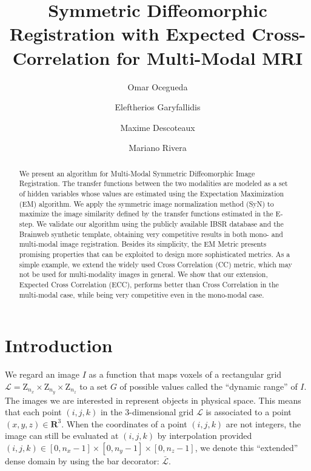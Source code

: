 \documentclass[11pt]{article}
\title{\textbf{Symmetric Diffeomorphic Registration with Expected Cross-Correlation for Multi-Modal MRI}}
\date{}
\author[a,*]{Omar Ocegueda}
\author[b]{Eleftherios Garyfallidis}
\author[b]{Maxime Descoteaux}
\author[a]{Mariano Rivera}
\affil[a]{Centro de Investigacion en Matematicas, Guanajuato, Gto, Mexico}
\affil[b]{University of Sherbrooke, Quebec, Canada}
\begin{document}
\maketitle
\begin{abstract}
    We present an algorithm for Multi-Modal Symmetric Diffeomorphic Image Registration. The transfer functions between the two modalities are modeled as a set of
    hidden variables whose values are estimated using the Expectation Maximization (EM) algorithm. We apply the symmetric image normalization method (SyN) to
    maximize the image similarity defined by the transfer functions estimated in the E-step. We validate our algorithm using the publicly available IBSR database
    and the Brainweb synthetic template, obtaining very competitive results in both mono- and multi-modal image registration. Besides its simplicity, the EM
    Metric presents promising properties that can be exploited to design more sophisticated metrics. As a simple example, we extend the widely used Cross
    Correlation (CC) metric, which may not be used for multi-modality images in general. We show that our extension, Expected Cross Correlation (ECC),
    performs better than Cross Correlation in the multi-modal case, while being very competitive even in the mono-modal case.
\end{abstract}

\section{Introduction}

We regard an image $I$ as a function that maps voxels of a rectangular grid \hbox{$\mathcal{L} = \mathrm{Z}_{n_{x}} \times \mathrm{Z}_{n_{y}} \times \mathrm{Z}_{n_{z}}$} to a set $G$ of
possible values called the ``dynamic range'' of $I$. The images we are interested in represent objects in physical space. This means that each point $(i,j,k)$ in the
3-dimensional grid $\mathcal{L}$ is associated to a point $(x,y,z) \in \mathbf{R}^{3}$. When the coordinates of a point
\hbox{$(i,j,k)$} are not integers, the image can still be evaluated at $(i, j, k)$ by interpolation provided
\hbox{$(i,j,k) \in \left[0, n_{x}-1\right] \times \left[0, n_{y}-1\right] \times \left[0, n_{z}-1\right]$}, we denote this ``extended'' dense domain by using the bar decorator:
$\bar{\mathcal{L}}$.\\
\end{document}
